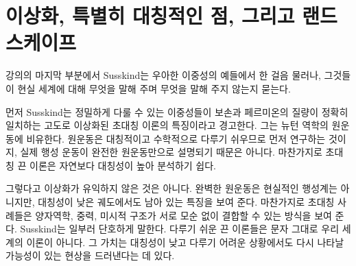 \begin{classroomqa}
\end{classroomqa}

\begin{classroomqa}
\end{classroomqa}

\begin{classroomqa}
\end{classroomqa}

\section{이상화, 특별히 대칭적인 점, 그리고 랜드스케이프}

강의의 마지막 부분에서 Susskind는 우아한 이중성의 예들에서 한 걸음 물러나, 그것들이 현실 세계에 대해 무엇을 말해 주며 무엇을 말해 주지 않는지 묻는다.

먼저 Susskind는 정밀하게 다룰 수 있는 이중성들이 보손과 페르미온의 질량이 정확히 일치하는 고도로 이상화된 초대칭 이론의 특징이라고 경고한다. 그는 뉴턴 역학의 원운동에 비유한다. 원운동은 대칭적이고 수학적으로 다루기 쉬우므로 먼저 연구하는 것이지, 실제 행성 운동이 완전한 원운동만으로 설명되기 때문은 아니다. 마찬가지로 초대칭 끈 이론은 자연보다 대칭성이 높아 분석하기 쉽다.

그렇다고 이상화가 유익하지 않은 것은 아니다. 완벽한 원운동은 현실적인 행성계는 아니지만, 대칭성이 낮은 궤도에서도 남아 있는 특징을 보여 준다. 마찬가지로 초대칭 사례들은 양자역학, 중력, 미시적 구조가 서로 모순 없이 결합할 수 있는 방식을 보여 준다. Susskind는 일부러 단호하게 말한다. 다루기 쉬운 끈 이론들은 문자 그대로 우리 세계의 이론이 아니다. 그 가치는 대칭성이 낮고 다루기 어려운 상황에서도 다시 나타날 가능성이 있는 현상을 드러낸다는 데 있다.

